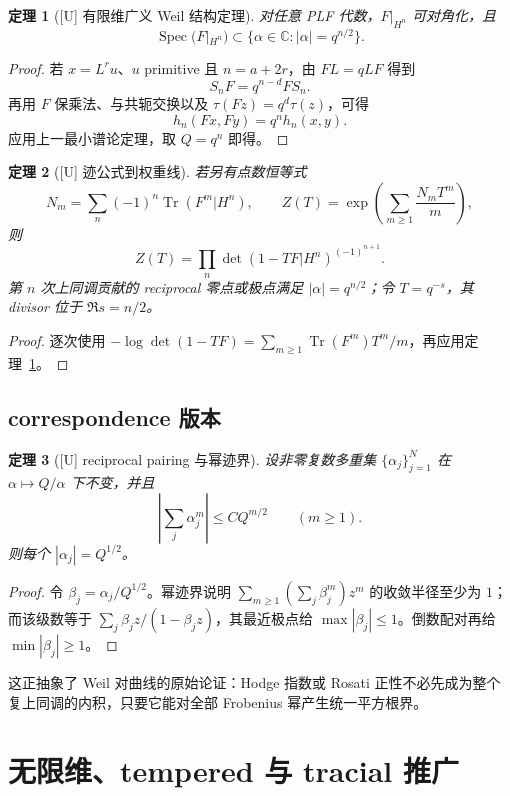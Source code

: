 \documentclass[UTF8,11pt,a4paper]{ctexart}
\newtheorem{theorem}{定理}[section]
\theoremstyle{definition}
\theoremstyle{remark}
\newcommand{\C}{\mathbb C}
\newcommand{\Tr}{\operatorname{Tr}}
\newcommand{\Spec}{\operatorname{Spec}}
\newcommand{\1}{\mathbf 1}
\newcommand{\statusU}{\textnormal{[U]}}
\begin{document}
\begin{theorem}[\statusU{} 有限维广义 Weil 结构定理]\label{thm:plf}
对任意 PLF 代数，$F|_{H^n}$ 可对角化，且
\[
  \Spec(F|_{H^n})\subset\{\alpha\in\C:|\alpha|=q^{n/2}\}.
\]
\end{theorem}

\begin{proof}
若 $x=L^ru$、$u$ primitive 且 $n=a+2r$，由 $FL=qLF$ 得到
\[
  S_nF=q^{n-d}FS_n.
\]
再用 $F$ 保乘法、与共轭交换以及 $\tau(Fz)=q^d\tau(z)$，可得
\[
  h_n(Fx,Fy)=q^nh_n(x,y).
\]
应用上一最小谱论定理，取 $Q=q^n$ 即得。
\end{proof}

\begin{theorem}[\statusU{} 迹公式到权重线]
若另有点数恒等式
\[
  N_m=\sum_n(-1)^n\Tr(F^m|H^n),\qquad
  Z(T)=\exp\!\left(\sum_{m\geq1}\frac{N_mT^m}{m}\right),
\]
则
\[
  Z(T)=\prod_n\det(1-TF|H^n)^{(-1)^{n+1}}.
\]
第 $n$ 次上同调贡献的 reciprocal 零点或极点满足 $|\alpha|=q^{n/2}$；令 $T=q^{-s}$，其 divisor 位于 $\Re s=n/2$。
\end{theorem}

\begin{proof}
逐次使用 $-\log\det(1-TF)=\sum_{m\geq1}\Tr(F^m)T^m/m$，再应用定理~\ref{thm:plf}。
\end{proof}

\subsection{correspondence 版本}

\begin{theorem}[\statusU{} reciprocal pairing 与幂迹界]
设非零复数多重集 $\{\alpha_j\}_{j=1}^N$ 在 $\alpha\mapsto Q/\alpha$ 下不变，并且
\[
  \left|\sum_j\alpha_j^m\right|\leq C Q^{m/2}\qquad(m\geq1).
\]
则每个 $|\alpha_j|=Q^{1/2}$。
\end{theorem}

\begin{proof}
令 $\beta_j=\alpha_j/Q^{1/2}$。幂迹界说明 $\sum_{m\geq1}(\sum_j\beta_j^m)z^m$ 的收敛半径至少为 $1$；而该级数等于 $\sum_j\beta_jz/(1-\beta_jz)$，其最近极点给 $\max|\beta_j|\leq1$。倒数配对再给 $\min|\beta_j|\geq1$。
\end{proof}

这正抽象了 Weil 对曲线的原始论证：Hodge 指数或 Rosati 正性不必先成为整个复上同调的内积，只要它能对全部 Frobenius 幂产生统一平方根界。

\section{无限维、tempered 与 tracial 推广}
\end{document}
